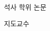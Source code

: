 \begin{titlepage}
  \centering
  \vspace*{20mm}
  {\large 석사 학위 논문\par}
  \vspace{25mm}
  {\LARGE\bfseries \ThesisTitleKo\par}
  \vspace{8mm}
  {\large \ThesisTitleEn\par}
  \vfill
  {\large \University\par}
  \vspace{3mm}
  {\large \Department\par}
  \vspace{3mm}
  {\large \AuthorKo\par}
  \vspace{15mm}
  {\large 지도교수\quad \AdvisorKo\par}
  \vspace{10mm}
  {\large \SubmitDate\par}
\end{titlepage}
